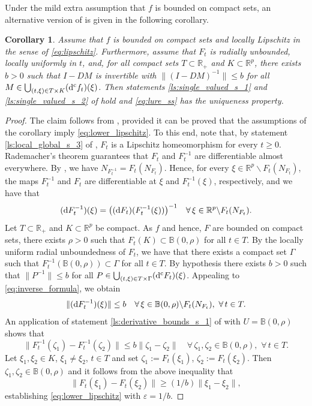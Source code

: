 \documentclass[a4paper,11pt]{article}
\newcommand{\B}{\mathbb B}
\newcommand{\R}{\mathbb R}
\numberwithin{equation}{section}
\numberwithin{figure}{section}
\numberwithin{table}{section}
\newtheorem{corollary}[theorem]{Corollary}
\begin{document}
Under the mild extra assumption that $f$ is bounded on compact sets, an alternative version of  is given in the following corollary.
%
\begin{corollary}\label{cor:single_valued_uniqueness}
Assume that $f$ is bounded on compact sets and locally Lipschitz in the sense of \eqref{eq:lipschitz}. Furthermore, assume that $F_t$ is radially unbounded, locally uniformly in $t$, and,
for all compact sets $T\subset\R_+$ and $K\subset\R^p$, there exists $b>0$ such that $I-
DM$ is invertible with $\|(I-DM)^{-1}\|\leq b$ for all $M\in\bigcup_{(t,\xi)\in T\times K}
({\rm d}^{\rm c}f_t)(\xi)$.
Then statements \ref{ls:single_valued_s_1} and \ref{ls:single_valued_s_2} of  hold and \eqref{eq:lure_ss} has the uniqueness property.
\end{corollary}
%
\begin{proof} The claim follows from , provided it can be proved that the assumptions of the corollary imply \eqref{eq:lower_lipschitz}. To this end, note that, by statement \ref{ls:local_global_s_3} of , $F_t$ is a Lipschitz homeomorphism for every $t\geq 0$. Rademacher's theorem guarantees that $F_t$ and $F_t^{-1}$ are differentiable almost everywhere. By \cite{bd24}, we have $N_{F_t^{-1}}=F_t(N_{F_t})$. Hence, for every $\xi\in\R^p\backslash F_t(N_{F_t})$, the maps $F_t^{-1}$ and $F_t$ are differentiable
at $\xi$ and $F_t^{-1}(\xi)$, respectively, and we have that
\begin{equation}\label{eq:inverse_formula}
({\rm d} F_t^{-1})(\xi)=\big(({\rm d}F_t)(F_t^{-1}(\xi))\big)^{-1}\quad\forall\,\xi\in\R^p\backslash F_t(N_{F_t}).
\end{equation}
Let $T\subset\R_+$ and $K\subset\R^p$ be compact. As $f$ and hence, $F$ are bounded on compact sets,
there exists $\rho>0$ such that $F_t(K)\subset\B(0,\rho)$ for all $t\in T$.
By the locally uniform radial unboundedness of $F_t$, we have that there exists a compact
set $\Gamma$ such that $F_t^{-1}(\B(0,\rho))\subset\Gamma$ for all $t\in T$. By hypothesis
there exists $b>0$ such that $\|P^{-1}\|\leq b$ for all $P\in\bigcup_{(t,\xi)\in T\times\Gamma}({\rm d}^{\rm c}F_t)(\xi)$. Appealing to \eqref{eq:inverse_formula}, we obtain
\[
\|({\rm d} F_t^{-1})(\xi)\|\leq b\quad\forall\,\xi\in\B(0,\rho)\backslash F_t(N_{F_t}),\,\,\forall\,t\in T.
\]
An application of statement \ref{ls:derivative_bounds_s_1} of  with $U=\B(0,\rho)$ shows that
\[
\|F_t^{-1}(\zeta_1)-F_t^{-1}(\zeta_2)\|\leq b\|\zeta_1-\zeta_2\|\quad\forall\,\zeta_1,\zeta_2\in\B(0,\rho),\,\,\forall\,t\in T.
\]
Let $\xi_1,\xi_2\in K$, $\xi_1\not=\xi_2$, $t\in T$ and set $\zeta_1:=F_t(\xi_1)$, $\zeta_2:=F_t(\xi_2)$. Then $\zeta_1,\zeta_2\in\B(0,\rho)$ and it follows from the
above inequality that
\[
\|F_t(\xi_1)-F_t(\xi_2)\|\geq (1/b)\|\xi_1-\xi_2\|,
\]
establishing \eqref{eq:lower_lipschitz} with $\varepsilon=1/b$.
\end{proof}
\end{document}
